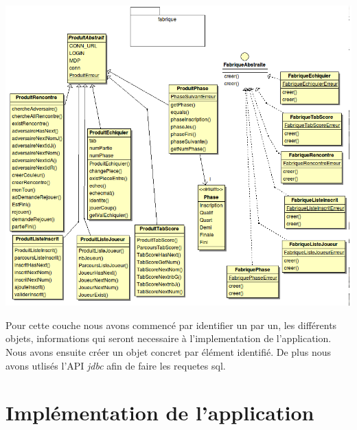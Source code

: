 \documentclass[10pt,a4paper]{report}
\begin{document}
\begin{center}
\includegraphics[width=18cm]{DiagClasseJavaFabrique.png}
\end{center}
Pour cette couche nous avons commencé par identifier un par un, les différents objets, informations qui seront necessaire à l'implementation de l'application. Nous avons ensuite créer un objet concret par élément identifié. De plus nous avons utlisés l'API \textit{jdbc} afin de faire les requetes sql.

\section{Implémentation de l'application}
\end{document}
